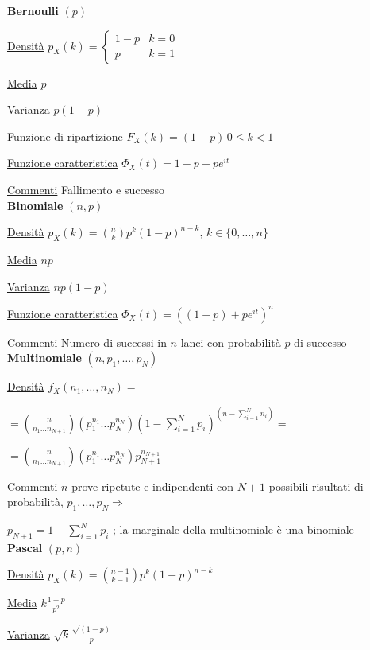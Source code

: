 \documentclass[openany]{book} %
\begin{document}
\begin{multicols}{2}

\textbf{Bernoulli} $(p)$

\underline{Densità} $p_X(k) = \begin {cases}1-p & k =0\\ p & k=1\end {cases}$

\underline{Media} $p$

\underline{Varianza} $p(1-p)$

\underline{Funzione di ripartizione} $F_X(k)=(1-p)\, 0\leq k <1 $

\underline{Funzione caratteristica} $\Phi_X(t)= 1-p+pe^{it}$

\underline{Commenti} Fallimento e successo
\\

\textbf{Binomiale} $(n,p)$  

\underline{Densità} $p_X(k) = \binom {n}{k}p^k(1-p)^{n-k},\,k \in \{0,\dots,n\}$

\underline{Media} $np$

\underline{Varianza} $np(1-p)$

\underline{Funzione caratteristica} $\Phi_X(t)=((1-p)+pe^{it})^n$

\underline{Commenti} Numero di successi in $n$ lanci con probabilità $p$ di successo
\\

\textbf{Multinomiale} $(n,p_1,\dots,p_N)$

\underline{Densità} $f_{\underline {X}}(n_1,\dots,n_N)=$

$=\binom {n}{n_1 \dots n_{N+1}}\left(p_1^{n_1}\dots p_N^{n_N}\right)\left(1-\sum_{i=1}^N p_i\right)^{\left(n-\sum_{i=1}^N n_i\right)}=$

$=\binom {n}{n_1 \dots n_{N+1}}\left(p_1^{n_1}\dots p_N^{n_N}\right)p_{N+1}^{n_{N+1}}$

\underline{Commenti} $n$ prove ripetute e indipendenti con $N+1$ possibili risultati di probabilità, \quad $p_1,\dots,p_N \Rightarrow$

$p_{N+1}=1-\sum_{i=1}^Np_i$ ; la marginale della multinomiale è una binomiale
\\

\textbf{Pascal} $(p,n)$

\underline{Densità} $p_X(k) = \binom {n-1}{k-1}p^k(1-p)^{n-k}$

\underline{Media} $k\frac{1-p}{p^2}$

\underline{Varianza} $\sqrt{k}\frac{\sqrt{(1-p)}}{p}$


\end{multicols}
\end{document}

